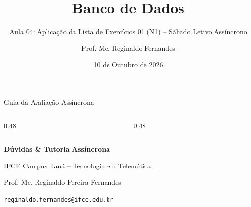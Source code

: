 \documentclass[aspectratio=169,utf8,t]{beamer}
\author{Prof. Me. Reginaldo Fernandes}
\institute{Instituto Federal do Ceará -- Campus Tauá \\ Tecnologia em Telemática}
\title{Banco de Dados}
\subtitle{Aula 04: Aplicação da Lista de Exercícios 01 (N1) -- Sábado Letivo Assíncrono}
\date{10 de Outubro de 2026}
\begin{document}
\frame[plain]{\titlepage}

\begin{frame}{Guia da Avaliação Assíncrona}
  \vspace{0.2cm}
  \begin{columns}[t]
    \begin{column}{0.48\textwidth}
      \tableofcontents[sections={1-3}]
    \end{column}
    \begin{column}{0.48\textwidth}
      \tableofcontents[sections={4-7}]
    \end{column}
  \end{columns}
\end{frame}









\begin{frame}[plain]
  \vspace{2cm}
  \centering
  {\Huge \textbf{Dúvidas \& Tutoria Assíncrona}}\par
  \vspace{0.8cm}
  {\large IFCE Campus Tauá -- Tecnologia em Telemática}\par
  \vspace{0.3cm}
  {\small Prof. Me. Reginaldo Pereira Fernandes}\par
  {\scriptsize \texttt{reginaldo.fernandes@ifce.edu.br}}
\end{frame}
\end{document}
